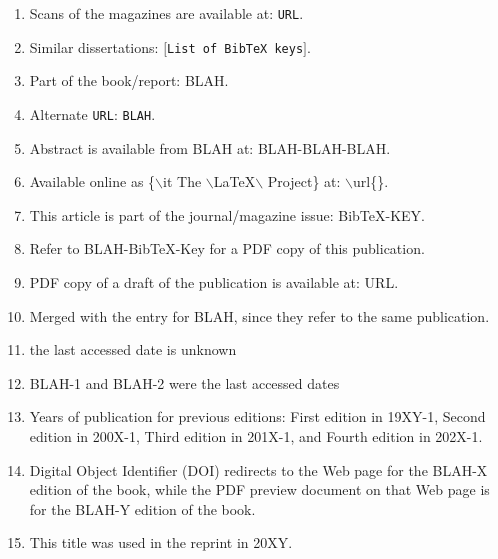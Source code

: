 \documentclass[letter,12pt]{article}
\begin{document}
\begin{enumerate}
\item Scans of the magazines are available at: {\tt URL}.
\item Similar dissertations: $[${\tt List of {\rm {\sc Bib}\TeX}\ keys}$]$.
\item Part of the book/report: BLAH.
\item Alternate {\tt URL}: {\tt BLAH}.
\item Abstract is available from BLAH at: BLAH-BLAH-BLAH.
\item Available online as \{$\backslash$it The $\backslash$LaTeX$\backslash$ Project\} at: $\backslash$url\{\}.
\item This article is part of the journal/magazine issue: BibTeX-KEY.
\item Refer to BLAH-BibTeX-Key for a PDF copy of this publication.
\item PDF copy of a draft of the publication is available at: URL.
\item Merged with the entry for BLAH, since they refer to the same publication.
\item the last accessed date is unknown
\item BLAH-1 and BLAH-2 were the last accessed dates
\item Years of publication for previous editions: First edition in 19XY-1, Second edition in 200X-1, Third edition in 201X-1, and Fourth edition in 202X-1.
\item Digital Object Identifier (DOI) redirects to the Web page for the BLAH-X edition of the book, while the PDF preview document on that Web page is for the BLAH-Y edition of the book.
\item This title was used in the reprint in 20XY.
\end{enumerate}










\end{document}
